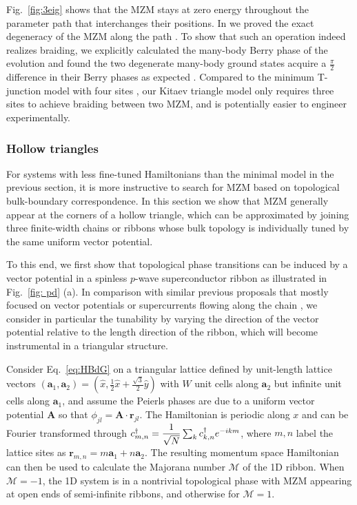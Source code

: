 Fig.~\ref{fig:3eig} shows that the MZM stays at zero energy throughout the parameter path that interchanges their positions. In \cite{supp} we proved the exact degeneracy of the MZM along the path \cite{FU_2021}. To show that such an operation indeed realizes braiding, we explicitly calculated the many-body Berry phase of the evolution \cite{supp,aliceaNonAbelianStatisticsTopological2011,liManipulatingMajoranaZero2016} and found the two degenerate many-body ground states acquire a $\frac{\pi}{2}$ difference in their Berry phases as expected \cite{aliceaNonAbelianStatisticsTopological2011}. Compared to the minimum T-junction model with four sites \cite{aliceaNonAbelianStatisticsTopological2011,Pandey_2023}, our Kitaev triangle model only requires three sites to achieve braiding between two MZM, and is potentially easier to engineer experimentally.

\subsubsection{Hollow triangles}
For systems with less fine-tuned Hamiltonians than the minimal model in the previous section, it is more instructive to search for MZM based on topological bulk-boundary correspondence. In this section we show that MZM generally appear at the corners of a hollow triangle, which can be approximated by joining three finite-width chains or ribbons whose bulk topology is individually tuned by the same uniform vector potential.

To this end, we first show that topological phase transitions can be induced by a vector potential in a spinless $p$-wave superconductor ribbon as illustrated in Fig.~\ref{fig: pd} (a). In comparison with similar previous proposals that mostly focused on vector potentials or supercurrents flowing along the chain \cite{romitoManipulatingMajoranaFermions2012, takasanSupercurrentinducedTopologicalPhase2022}, we consider in particular the tunability by varying the direction of the vector potential relative to the length direction of the ribbon, which will become instrumental in a triangular structure.

Consider Eq.~\eqref{eq:HBdG} on a triangular lattice defined by unit-length lattice vectors $(\mathbf a_1, \mathbf a_2) = (\hat{x}, \frac{1}{2}\hat{x} + \frac{\sqrt{3}}{2}\hat{y})$ with $W$ unit cells along $\mathbf a_2$ but infinite unit cells along $\mathbf a_1$, and assume the Peierls phases are due to a uniform vector potential $\mathbf A$ so that $\phi_{jl} = \mathbf A\cdot \mathbf r_{jl}$. The Hamiltonian is periodic along $x$ and can be Fourier transformed through $c^{\dagger}_{m,n} = \dfrac{1}{\sqrt{N}} \sum_{k} c^{\dagger}_{k,n} e^{-i km}$, where $m,n$ label the lattice sites as $\mathbf r_{m,n} = m\mathbf a_1 + n \mathbf a_2$. The resulting momentum space Hamiltonian \cite{supp} can then be used to calculate the Majorana number \cite{kitaevUnpairedMajoranaFermions2001,liTopologicalSuperconductivityInduced2014} $\mathcal{M}$ of the 1D ribbon. When $\mathcal{M} = -1$, the 1D system is in a nontrivial topological phase with MZM appearing at open ends of semi-infinite ribbons, and otherwise for $\mathcal{M} = 1$.

